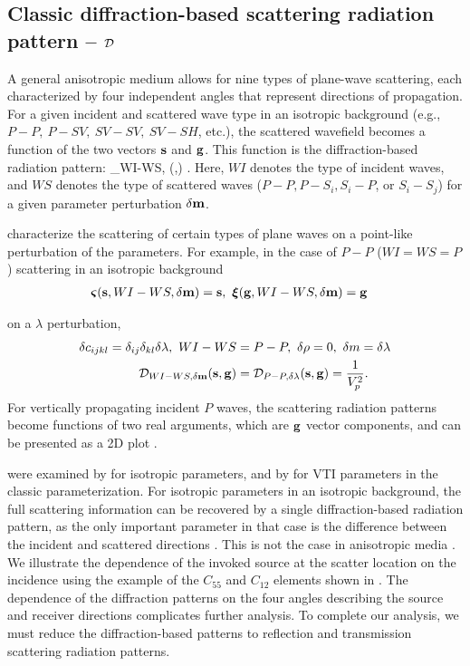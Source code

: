 \subsection{Classic diffraction-based scattering radiation pattern -- $\mathcal{D}$} 
A general anisotropic medium allows for nine types of plane-wave scattering, 
each characterized by four independent angles that represent directions of 
propagation.
For a given incident and scattered wave type in an isotropic background (e.g., $P-P,~ P-SV,~SV-SV,~SV-SH$, 
etc.), the scattered wavefield becomes a function of the two vectors $\mathbf{s}$ and 
$\mathbf{g}$. This function is the diffraction-based radiation pattern:
\beq
\Dp_{WI-WS, \delta \mv}(\sv,\gv) \equiv {}.
\eeq
Here, $WI$ denotes the type of incident waves, and $WS$ denotes the type of scattered 
waves ($P-P, P-S_i, S_i-P$, or $S_i-S_j$) for a given parameter perturbation 
$\delta \mathbf{m}$. 



\DP characterize the scattering of certain 
types of plane waves on a point-like perturbation of the parameters. For example, in the case of $P-P$ ($WI=WS=P$) scattering in an isotropic background 
\begin{align}
\bm{\varsigma}(\mathbf{s}, {WI-WS, \delta \mathbf{m}}) &= \mathbf{s},~ 
\bm{\xi} (\mathbf{g}, {WI-WS, \delta \mathbf{m}})  = \mathbf{g} 
\end{align}

on a $\lambda$ 
perturbation,
\begin{align}
	\delta c_{ijkl} = \delta_{ij} \delta_{kl} \delta \lambda, ~
	WI-WS &= P-P, ~
	\delta \rho = 0,~ \delta m = \delta \lambda \\
	\mathcal{D}_{WI-WS, \delta \mathbf{m}} (\mathbf{s},\mathbf{g}) &= \mathcal{D}_{P-P,\delta\lambda} (\mathbf{s},\mathbf{g}) = \frac{1}{V_p^2}.
\end{align}
For vertically propagating incident $P$ waves, the scattering radiation 
patterns become functions of two real arguments, which are $\mathbf{g}$ vector components, 
and can be presented as a 2D plot \citep{eaton1994}.


\DP were examined by \cite{wu1985,tarantola1986,beylkin1990} for isotropic 
parameters, 
and by \cite{calvet2006} for VTI parameters in the classic \cite{thomsen1986}
parameterization. For isotropic parameters in an isotropic background, the full
scattering information can be recovered by a single  diffraction-based  radiation  pattern, as the only 
important parameter in that case is the difference between the incident and 
scattered directions \citep{wu1985,tarantola1986}. This is not the case in anisotropic media \citep[e.g.,][]{eaton1994,calvet2006,juwon2016}. We illustrate the dependence of the invoked source at the scatter location on the incidence using the example of the $C_{55}$ and $C_{12}$ elements shown in . The dependence of the diffraction patterns on the four angles describing the source and receiver directions complicates further analysis. To complete our analysis, we must reduce the diffraction-based patterns to reflection and transmission scattering radiation patterns. 

